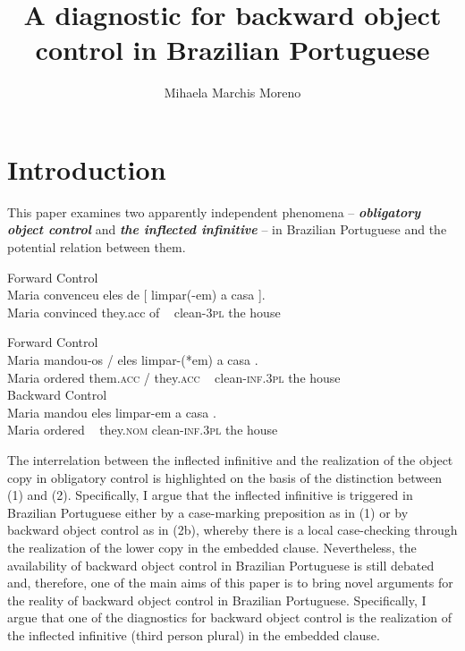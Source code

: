 \documentclass[output=paper]{langsci/langscibook}
\author{Mihaela Marchis Moreno\affiliation{FCSH, Universidade Nova de Lisboa}}
\title{A diagnostic for backward object control in Brazilian Portuguese}
\begin{document}
\section{Introduction}%
This paper examines two apparently independent phenomena – \textbf{\textit{obligatory object control}} and \textbf{\textit{the inflected infinitive} }– in Brazilian Portuguese and the potential relation between them.

\ea%
         Forward Control\label{ex:moreno:1}\\
    \gll Maria convenceu eles  de    [  limpar(-em)   a     casa ].\\
         Maria convinced they.acc of ~  clean-\textsc{3pl}  the house\\
\z

\ea\label{ex:moreno:2}%
    \ea  Forward Control\\
    \gll Maria  mandou-os                   /   eles        {\ob}  limpar-(*em) a     casa {\cb}.   \\
         Maria {ordered  them.\textsc{acc}} /   they.\textsc{acc}   ~   clean-\textsc{inf.3pl} the house\\
    \glt
    \ex  Backward Control\\
    \gll Maria mandou {\ob}    eles    limpar-em     a     casa {\cb}.\\
         Maria  ordered  ~  they.\textsc{nom}      clean-\textsc{inf.3pl}          the house\\
        \z
\z

The interrelation between the inflected infinitive and the realization of the object copy in obligatory control is highlighted on the basis of the distinction between (1) and (2). Specifically, I argue that the inflected infinitive is triggered in Brazilian Portuguese either by a case-marking preposition as in (1) or by backward object control as in (2b), whereby there is a local case-checking through the realization of the lower copy in the embedded clause. Nevertheless, the availability of backward object control in Brazilian Portuguese is still debated and, therefore, one of the main aims of this paper is to bring novel arguments for the reality of backward object control in Brazilian Portuguese. Specifically, I argue that one of the diagnostics for backward object control is the realization of the inflected infinitive (third person plural) in the embedded clause.
\end{document}
